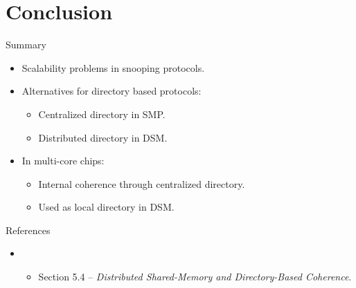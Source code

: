 \section{Conclusion}

\begin{frame}[t]{Summary}
\begin{itemize}
  \item Scalability problems in snooping protocols.
  \item Alternatives for directory based protocols:
    \begin{itemize}
      \item Centralized directory in SMP.
      \item Distributed directory in DSM.
    \end{itemize}
  \item In multi-core chips:
    \begin{itemize}
      \item Internal coherence through centralized directory.
      \item Used as local directory in DSM.
    \end{itemize}
\end{itemize}
\end{frame}


\begin{frame}[t]{References}
\begin{itemize}
  \item \bibhennessy
    \begin{itemize}
      \item Section 5.4 -- \emph{Distributed Shared-Memory and Directory-Based Coherence}.
    \end{itemize}

\end{itemize}
\end{frame}
